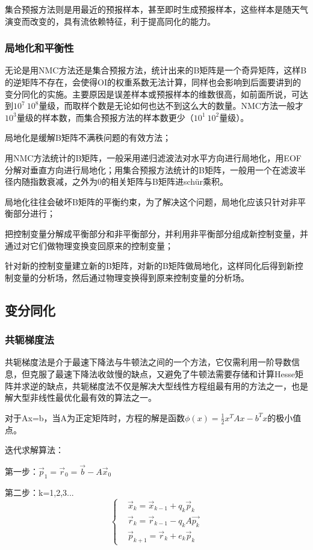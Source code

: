 \documentclass{article}
\begin{document}
集合预报方法则是用最近的预报样本，甚至即时生成预报样本，这些样本是随天气演变而改变的，具有流依赖特征，利于提高同化的能力。

\subsubsection{局地化和平衡性}
无论是用NMC方法还是集合预报方法，统计出来的B矩阵是一个奇异矩阵，这样B的逆矩阵不存在，会使得OI的权重系数无法计算，同样也会影响到后面要讲到的变分同化的实施。主要原因是误差样本或预报样本的维数很高，如前面所说，可达到$10^7~10^8$量级，而取样个数是无论如何也达不到这么大的数量。NMC方法一般才$10^3$量级的样本数，而集合预报方法的样本数更少（$10^1~10^2$量级）。

局地化是缓解B矩阵不满秩问题的有效方法；

用NMC方法统计的B矩阵，一般采用递归滤波法对水平方向进行局地化，用EOF分解对垂直方向进行局地化；用集合预报方法统计的B矩阵，一般用一个在滤波半径内随指数衰减，之外为0的相关矩阵与B矩阵进schür乘积。

局地化往往会破坏B矩阵的平衡约束，为了解决这个问题，局地化应该只针对非平衡部分进行；

把控制变量分解成平衡部分和非平衡部分，并利用非平衡部分组成新控制变量，并通过对它们做物理变换变回原来的控制变量；

针对新的控制变量建立新的B矩阵，对新的B矩阵做局地化，这样同化后得到新控制变量的分析场，然后通过物理变换得到原来控制变量的分析场。

\subsection{变分同化}
\subsubsection{共轭梯度法}
共轭梯度法是介于最速下降法与牛顿法之间的一个方法，它仅需利用一阶导数信息，但克服了最速下降法收敛慢的缺点，又避免了牛顿法需要存储和计算Hesse矩阵并求逆的缺点，共轭梯度法不仅是解决大型线性方程组最有用的方法之一，也是解大型非线性最优化最有效的算法之一。

对于Ax=b，当A为正定矩阵时，方程的解是函数$\phi(x) = \frac{1}{2}x^TAx - b^Tx$的极小值点。

迭代求解算法：

第一步：$\vec{p}_1 = \vec{r}_0 = \vec{b} - A\vec{x}_0$

第二步：k=1,2,3...
$$\begin{cases}
    & \vec{x}_k = \vec{x}_{k-1} + q_k\vec{p}_k \\
    & \vec{r}_k = \vec{r}_{k-1} - q_kA\vec{p_k} \\
    & \vec{p}_{k+1} = \vec{r}_k + e_k\vec{p}_k
\end{cases}$$
\end{document}
